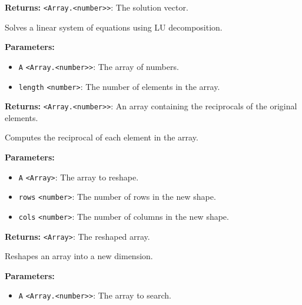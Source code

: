 \documentclass[12pt,a4paper]{article}
\begin{document}
\noindent \textbf{Returns:} \texttt{<Array.<number>>}: The solution vector.

\noindent Solves a linear system of equations using LU decomposition.

\vspace{5mm}
\noindent {}


\noindent \textbf{Parameters:}
\begin{itemize}
  \item \texttt{A} \texttt{<Array.<number>>}: The array of numbers.
  \item \texttt{length} \texttt{<number>}: The number of elements in the array.
\end{itemize}

\noindent \textbf{Returns:} \texttt{<Array.<number>>}: An array containing the reciprocals of the original elements.

\noindent Computes the reciprocal of each element in the array.

\vspace{5mm}
\noindent {}


\noindent \textbf{Parameters:}
\begin{itemize}
  \item \texttt{A} \texttt{<Array>}: The array to reshape.
  \item \texttt{rows} \texttt{<number>}: The number of rows in the new shape.
  \item \texttt{cols} \texttt{<number>}: The number of columns in the new shape.
\end{itemize}

\noindent \textbf{Returns:} \texttt{<Array>}: The reshaped array.

\noindent Reshapes an array into a new dimension.

\vspace{5mm}
\noindent {}


\noindent \textbf{Parameters:}
\begin{itemize}
  \item \texttt{A} \texttt{<Array.<number>>}: The array to search.
\end{itemize}
\end{document}
